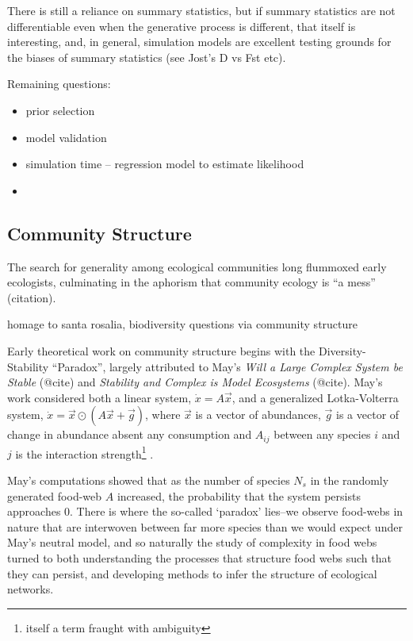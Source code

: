 There is still a reliance on summary statistics, but if summary
statistics are not differentiable even when the generative process is
different, that itself is interesting, and, in general, simulation
models are excellent testing grounds for the biases of summary
statistics (see Jost's D vs Fst etc).

Remaining questions:

\begin{itemize}
\item
  prior selection
\item
  model validation
\item
  simulation time -- regression model to estimate likelihood
\item
\end{itemize}

\hypertarget{community-structure}{%
\subsection{Community Structure}\label{community-structure}}

The search for generality among ecological communities long flummoxed
early ecologists, culminating in the aphorism that community ecology is
``a mess'' (citation).

homage to santa rosalia, biodiversity questions via community structure

Early theoretical work on community structure begins with the
Diversity-Stability ``Paradox'', largely attributed to May's \emph{Will
a Large Complex System be Stable} (@cite) and \emph{Stability and
Complex is Model Ecosystems} (@cite). May's work considered both a
linear system, \(\dot{x} = A\vec{x}\), and a generalized Lotka-Volterra
system, \(\dot{x} = \vec{x} \odot (A \vec{x} + \vec{g})\), where
\(\vec{x}\) is a vector of abundances, \(\vec{g}\) is a vector of change
in abundance absent any consumption and \(A_{ij}\) between any species
\(i\) and \(j\) is the interaction strength\footnote{itself a term
  fraught with ambiguity} .

May's computations showed that as the number of species \(N_s\) in the
randomly generated food-web \(A\) increased, the probability that the
system persists approaches \(0\). There is where the so-called `paradox'
lies--we observe food-webs in nature that are interwoven between far
more species than we would expect under May's neutral model, and so
naturally the study of complexity in food webs turned to both
understanding the processes that structure food webs such that they can
persist, and developing methods to infer the structure of ecological
networks.

